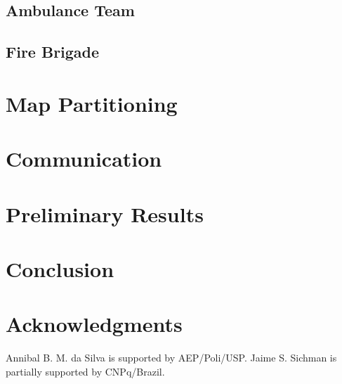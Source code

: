 \documentclass{llncs}
\begin{document}
\subsection{Ambulance Team}
	\label{subsec:ambulanceTeam}
	

\subsection{Fire Brigade}
	\label{subsec:fireBrigade}
	

\section{Map Partitioning}
	\label{sec:partitioning}
	

\section{Communication}
	\label{sec:communication}
	

\section{Preliminary Results}
	\label{sec:preResults}
	

\section{Conclusion}
	\label{sec:conclusion}
	

\section*{Acknowledgments}
\label{sec:acknowledgments}
Annibal B. M. da Silva is supported by AEP/Poli/USP. Jaime S. Sichman is partially supported by CNPq/Brazil.


\end{document}
